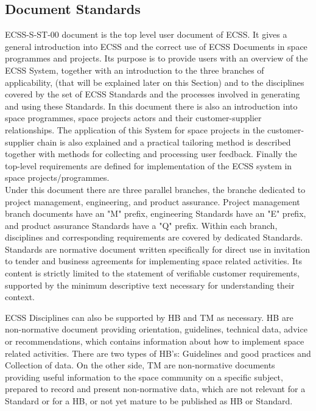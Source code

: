 \subsection{Document Standards}\label{sec:doc-stand}
ECSS-S-ST-00\cite{ecss-s-st-00c} document is the top level user document of \ac{ECSS}.
It gives a general introduction into \ac{ECSS} and the correct use of \ac{ECSS} Documents in space
programmes and projects.
Its purpose is to provide users with an overview of the \ac{ECSS} System, together
with an introduction to the three branches of applicability, (that will be explained later on this Section) and to the disciplines
covered by the set of \ac{ECSS} Standards and the processes involved in generating
and using these Standards.
In this document there is also an introduction into space programmes, space projects actors and their
customer-supplier relationships. The application of this System for space projects in the customer-supplier
chain is also explained and a practical tailoring method is described together with
methods for collecting and processing user feedback.
Finally the top-level requirements are defined for implementation of the \ac{ECSS}
system in space projects/programmes\cite{ecss-s-st-00c}.\\

Under this document there are three parallel branches, the branche dedicated to project management,
engineering, and product assurance.
Project management branch documents have an "M" prefix, engineering Standards have an "E" prefix, and product assurance Standards have a "Q" prefix.
Within each branch, disciplines and corresponding requirements are covered by dedicated Standards.
Standards are normative document written specifically for direct use in invitation to tender and 
business agreements for implementing space related activities. Its content 
is strictly limited to the statement of verifiable customer requirements, supported 
by the minimum descriptive text necessary for understanding their context.

\ac{ECSS} Disciplines can also be supported by \ac{HB} and \ac{TM} as necessary\cite{ecss-s-st-00c}.
\ac{HB} are non-normative document providing orientation, 
guidelines, technical data, advice or recommendations, which contains 
information about how to implement space related activities. There are two types of \ac{HB}'s: Guidelines and good practices and Collection of data.
On the other side, \ac{TM} are non-normative documents providing useful information to the space community 
on a specific subject, prepared to record and present non-normative data, which 
are not relevant for a Standard or for a \ac{HB}, or not yet mature to be published as \ac{HB} or Standard.

